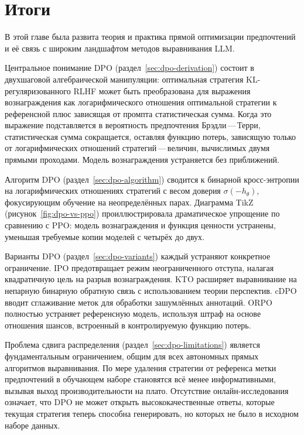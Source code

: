 \section{Итоги}
\label{sec:ch12-summary}

В этой главе была развита теория и практика прямой оптимизации предпочтений и её связь с широким ландшафтом методов выравнивания LLM.

Центральное понимание DPO (раздел~\ref{sec:dpo-derivation}) состоит в двухшаговой алгебраической манипуляции: оптимальная стратегия KL-регуляризованного RLHF может быть преобразована для выражения вознаграждения как логарифмического отношения оптимальной стратегии к референсной плюс зависящая от промпта статистическая сумма. Когда это выражение подставляется в вероятность предпочтения Брэдли\,---\,Терри, статистическая сумма сокращается, оставляя функцию потерь, зависящую только от логарифмических отношений стратегий\,---\,величин, вычислимых двумя прямыми проходами. Модель вознаграждения устраняется без приближений.

Алгоритм DPO (раздел~\ref{sec:dpo-algorithm}) сводится к бинарной кросс-энтропии на логарифмических отношениях стратегий с весом доверия $\sigma(-h_\theta)$, фокусирующим обучение на неопределённых парах. Диаграмма TikZ (рисунок~\ref{fig:dpo-vs-ppo}) проиллюстрировала драматическое упрощение по сравнению с PPO: модель вознаграждения и функция ценности устранены, уменьшая требуемые копии моделей с четырёх до двух.

Варианты DPO (раздел~\ref{sec:dpo-variants}) каждый устраняют конкретное ограничение. IPO предотвращает режим неограниченного отступа, налагая квадратичную цель на разрыв вознаграждения. KTO расширяет выравнивание на непарную бинарную обратную связь с использованием теории перспектив. cDPO вводит сглаживание меток для обработки зашумлённых аннотаций. ORPO полностью устраняет референсную модель, используя штраф на основе отношения шансов, встроенный в контролируемую функцию потерь.

Проблема сдвига распределения (раздел~\ref{sec:dpo-limitations}) является фундаментальным ограничением, общим для всех автономных прямых алгоритмов выравнивания. По мере удаления стратегии от референса метки предпочтений в обучающем наборе становятся всё менее информативными, вызывая выход производительности на плато. Отсутствие онлайн-исследования означает, что DPO не может открыть высококачественные ответы, которые текущая стратегия теперь способна генерировать, но которых не было в исходном наборе данных.

